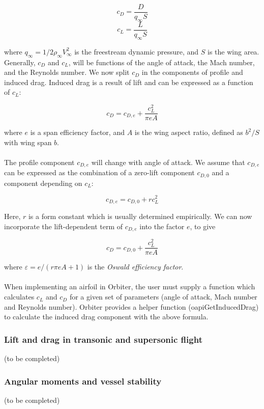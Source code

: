 \documentclass[Orbiter Developer Manual.tex]{subfiles}
\begin{document}
\[ c_{D} = \frac{D}{q_{\infty} S} \]
\[ c_{L} = \frac{L}{q_{\infty} S} \]

\noindent
where $q_{\infty} = 1/2 \rho_{\infty} V^{2}_{\infty}$ is the freestream dynamic pressure, and $S$ is the wing area. Generally, $c_{D}$ and $c_{L}$, will be functions of the angle of attack, the Mach number, and the Reynolds number. We now split $c_{D}$ in the components of profile and induced drag. Induced drag is a result of lift and can be expressed as a function of $c_{L}$:

\[ c_{D} = c_{D,e} + \frac{c_{L}^{2}}{\pi eA} \]

\noindent
where $e$ is a span efficiency factor, and $A$ is the wing aspect ratio, defined as $b^{2}/S$ with wing span $b$.\\
\\
The profile component $c_{D,e}$ will change with angle of attack. We assume that $c_{D,e}$ can be expressed as the combination of a zero-lift component $c_{D,0}$ and a component depending on $c_{L}$:

\[ c_{D,e} = c_{D,0} + rc_{L}^{2} \]

\noindent
Here, $r$ is a form constant which is usually determined empirically. We can now incorporate the lift-dependent term of $c_{D,e}$ into the factor $e$, to give

\[ c_{D} = c_{D,0} + \frac{c_{L}^{2}}{\pi eA} \]

\noindent
where $\varepsilon = e / (r \pi eA + 1)$ is the \textit{Oswald efficiency factor}.\\
\\
When implementing an airfoil in Orbiter, the user must supply a function which calculates $c_{L}$ and $c_{D}$ for a given set of parameters (angle of attack, Mach number and Reynolds number). Orbiter provides a helper function (oapiGetInducedDrag) to calculate the induced drag component with the above formula.


\subsubsection{Lift and drag in transonic and supersonic flight}
(to be completed)


\subsubsection{Angular moments and vessel stability}
(to be completed)
\end{document}
